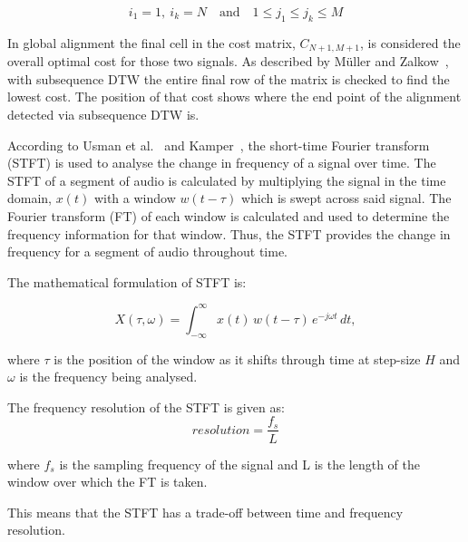 \begin{equation}
    i_1 = 1,\ i_k = N \quad \text{and} \quad 1 \le j_1 \le j_k \le M
\end{equation}

In global alignment the final cell in the cost matrix, $C_{N+1, M+1}$, is considered the 
overall optimal cost for those two signals. As described by M\"uller and Zalkow~\cite{dtw_subsequence}, 
with subsequence \acs{DTW} the entire final row of 
the matrix is checked to find the lowest cost. The position of that cost shows where the 
end point of the alignment detected via subsequence \acs{DTW} is.

\label{sec:feature-extraction-methods-background}


\label{sec:short-time-fourier-transform}
According to Usman et al.~\cite{Det_Tech} and Kamper~\cite{stft_kamper}, the short-time Fourier transform (\acs{STFT}) is used to analyse the change in frequency of a signal over time. The \acs{STFT} of 
a segment of audio is calculated by multiplying the signal in the time domain, $x(t)$ with 
a window $w(t-\tau)$ which is swept across said signal. The Fourier transform (\acs{FT}) of each 
window is calculated and used to determine the frequency information for that window. 
Thus, the \acs{STFT} provides the change in frequency for a segment of audio throughout 
time.

The mathematical formulation of \acs{STFT} is:

  \begin{equation}
    X(\tau, \omega) = \int_{-\infty}^{\infty} x(t)\, w(t - \tau)\, e^{-j\omega t}\, dt,
  \end{equation}

where $\tau$ is the position of the window as it shifts through time at step-size $H$ and $\omega$ is 
the frequency being analysed.

The frequency resolution of the \acs{STFT} is given as:
\begin{equation}
    resolution = \frac{f_s}{L}
    \label{eq:freq_resolution} 
\end{equation}

where $f_s$ is the sampling frequency of the signal and L is the length of the window over which the \acs{FT} is taken. 

This means that the \acs{STFT} has a trade-off between time and frequency resolution. 

